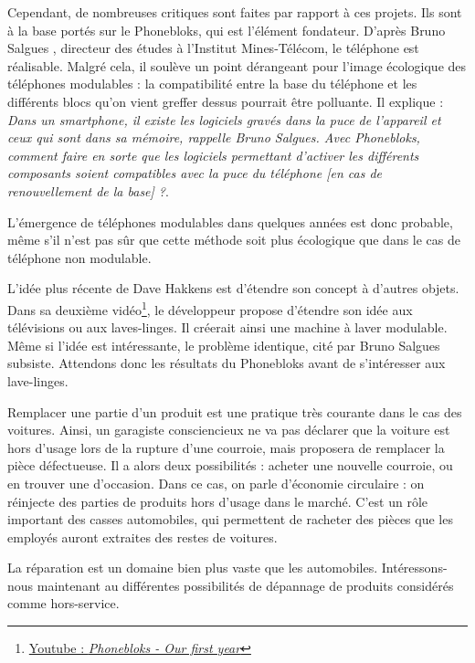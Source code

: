 Cependant, de nombreuses critiques sont faites par rapport à ces projets. Ils sont à la base portés sur le Phonebloks, qui est l'élément fondateur. D'après  Bruno Salgues \cite{phonebloks_critiques} , directeur des études à l'Institut Mines-Télécom, le téléphone est réalisable. Malgré cela, il soulève un point  dérangeant pour l'image écologique des téléphones modulables : la compatibilité entre la base du téléphone et les différents blocs qu'on vient greffer dessus pourrait être polluante. Il explique : \og{}\textit{Dans un smartphone, il existe les logiciels gravés dans la puce de l’appareil et ceux qui sont dans sa mémoire, rappelle Bruno Salgues. Avec Phonebloks, comment faire en sorte que les logiciels permettant d'activer les différents composants soient compatibles avec la puce du téléphone [en cas de renouvellement de la base] ?}\fg{}. 

\medbreak 

L'émergence de téléphones modulables dans quelques années est donc probable, même s'il n'est pas sûr que cette méthode soit plus écologique que dans le cas de téléphone non modulable. 

L'idée plus récente de Dave Hakkens est d'étendre son concept à d'autres objets. Dans sa deuxième vidéo\footnote{\href{https://www.youtube.com/watch?v=4KmewIC-eV4}{Youtube : \textit{Phonebloks - Our first year}}}, le développeur propose d'étendre son idée aux télévisions ou aux laves-linges. Il créerait ainsi une machine à laver modulable. Même si l'idée est intéressante, le problème identique, cité par Bruno Salgues subsiste. Attendons donc les résultats du Phonebloks avant de s'intéresser aux lave-linges. 

\bigbreak

Remplacer une partie d'un produit est une pratique très courante dans le cas des voitures. 
Ainsi, un garagiste consciencieux ne va pas déclarer que la voiture est hors d'usage lors de la rupture d'une courroie, mais proposera de remplacer la pièce défectueuse. Il a alors deux possibilités : acheter une nouvelle courroie, ou en trouver une d'occasion. Dans ce cas, on parle d'économie circulaire : on réinjecte des parties de produits hors d'usage dans le marché. C'est un rôle important des casses automobiles, qui permettent de racheter des pièces que les employés auront extraites des restes de voitures. 

La réparation est un domaine bien plus vaste que les automobiles. Intéressons-nous maintenant au différentes possibilités de dépannage de produits considérés comme hors-service. 